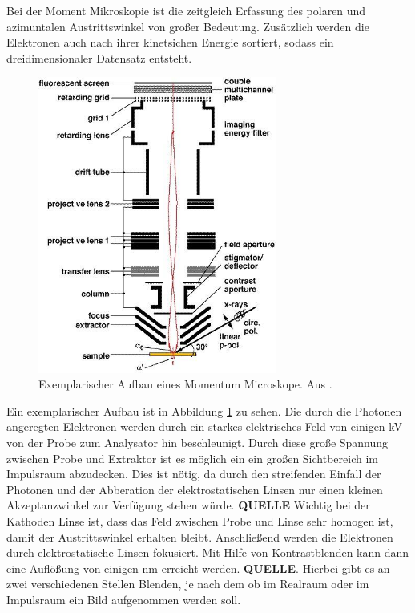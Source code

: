        Bei der Moment Mikroskopie ist die zeitgleich Erfassung des polaren und azimuntalen Austrittswinkel von großer Bedeutung. 
        Zusätzlich werden die Elektronen auch nach ihrer kinetsichen Energie sortiert, sodass ein dreidimensionaler Datensatz entsteht.

        \begin{figure}
            \centering
            \includegraphics[width=0.7\textwidth]{./content/PEEM_schemaneu.jpg}
            \caption{Exemplarischer Aufbau eines Momentum Microskope. Aus \cite{KUCH}.}
            \label{fig:MM}
        \end{figure}
        Ein exemplarischer Aufbau ist in Abbildung \ref{fig:MM} zu sehen.
        Die durch die Photonen angeregten Elektronen werden durch ein starkes elektrisches Feld von einigen \si{\kilo\volt} von der Probe zum Analysator hin beschleunigt.
        Durch diese große Spannung zwischen Probe und Extraktor ist es möglich ein ein großen Sichtbereich im Impulsraum abzudecken.
        Dies ist nötig, da durch den streifenden Einfall der Photonen und der Abberation der elektrostatischen Linsen nur einen kleinen Akzeptanzwinkel zur Verfügung stehen würde. \textbf{QUELLE}
        Wichtig bei der Kathoden Linse ist, dass das Feld zwischen Probe und Linse sehr homogen ist, damit der Austrittswinkel erhalten bleibt.
        Anschließend werden die Elektronen durch elektrostatische Linsen fokusiert.
        Mit Hilfe von Kontrastblenden kann dann eine Auflößung von einigen \si{\nano\meter} erreicht werden. \textbf{QUELLE}.
        Hierbei gibt es an zwei verschiedenen Stellen Blenden, je nach dem ob im Realraum oder im Impulsraum ein Bild aufgenommen werden soll.

